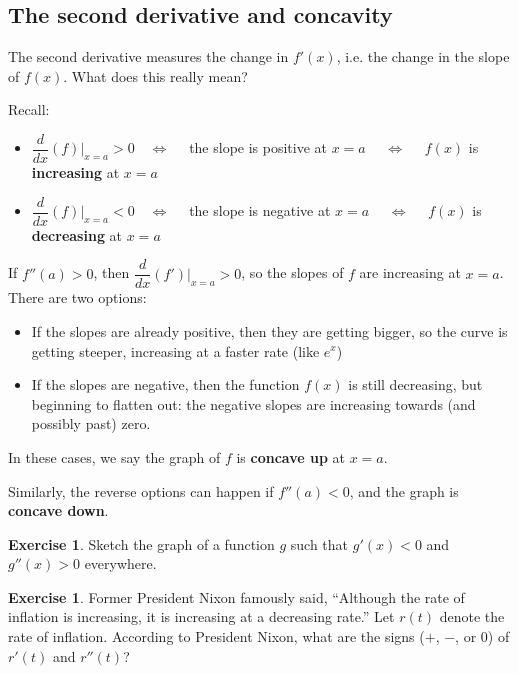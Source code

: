 \documentclass[11pt,reqno,final]{amsart}
\numberwithin{figure}{section}
\theoremstyle{definition} %
\newtheorem{exercise}[question]{Exercise}
\begin{document}
\subsection{The second derivative and concavity}

The second derivative measures the change in $f'(x)$, i.e. the change in the slope of $f(x)$.
What does this really mean?

Recall:
\begin{itemize}
\item $\dfrac{d}{dx}(f)|_{x=a} > 0 \quad \Leftrightarrow \quad$
        the slope is positive at $x=a$ $\quad \Leftrightarrow \quad$
        $f(x)$ is \textbf{increasing} at $x=a$
\item $\dfrac{d}{dx}(f)|_{x=a} < 0 \quad \Leftrightarrow \quad$
        the slope is negative at $x=a$ $\quad \Leftrightarrow \quad$
        $f(x)$ is \textbf{decreasing} at $x=a$
\end{itemize}

If $f''(a) >0$, then $\dfrac{d}{dx}(f')|_{x=a}>0$, so the slopes of $f$ are increasing at $x=a$.
There are two options:
\begin{itemize}
\item If the slopes are already positive, then they are getting bigger, so the curve is getting steeper, increasing at a faster rate (like $e^x$)
\item If the slopes are negative, then the function $f(x)$ is still decreasing, but beginning to flatten out: the negative slopes are increasing towards (and possibly past) zero.
\end{itemize}
In these cases, we say the graph of $f$ is \textbf{concave up} at $x=a$.

Similarly, the reverse options can happen if $f''(a)<0$, and the graph is \textbf{concave down}.

\newpage

\begin{exercise}
        Sketch the graph of a function $g$ such that $g'(x) < 0$ and $g''(x) > 0$ everywhere.
        \vfill
\end{exercise}

\begin{exercise}
        Former President Nixon famously said,
        ``Although the rate of inflation is increasing, it is increasing at a decreasing rate.''
        Let $r(t)$ denote the rate of inflation.
        According to President Nixon, what are the signs ($+$, $-$, or 0)
        of $r'(t)$ and $r''(t)$?\\[10pt]        
\end{exercise}
\end{document}
